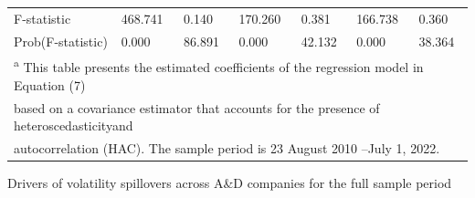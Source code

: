 \documentclass[
  letterpaper,
  DIV=11,
  numbers=noendperiod]{scrartcl}
\begin{document}
\begin{table}[H]
{\begin{tabular}[t]{lllllll}
F-statistic & 468.741 & 0.140 & 170.260 & 0.381 & 166.738 & 0.360\\
Prob(F-statistic) & 0.000 & 86.891 & 0.000 & 42.132 & 0.000 & 38.364\\
\bottomrule
\multicolumn{7}{l}{\textsuperscript{a} This table presents the estimated coefficients of the regression model in Equation (7)}\\
\multicolumn{7}{l}{based on a covariance estimator that accounts for the presence of heteroscedasticityand}\\
\multicolumn{7}{l}{autocorrelation (HAC). The sample period is 23 August 2010 –July 1, 2022.}\\
\end{tabular}}
\end{table}

\hypertarget{tbl-reg2}{}
\begin{table}[H]
\caption{\label{tbl-reg2}Drivers of volatility spillovers across A\&D companies for the full
sample period }\tabularnewline


\end{table}
\end{document}
